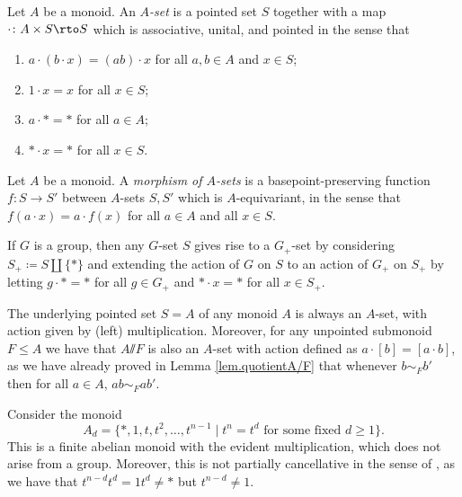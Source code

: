 \documentclass[11pt]{amsart}
\renewcommand{\ss}{\mathord{\sslash}}
\begin{document}
\begin{definition}
    Let $A$ be a monoid.  An \emph{$A$-set} is a pointed set $S$ together with a map $\cdot\colon  A \times S \rto S$ which is associative, unital, and pointed in the sense that
    \begin{enumerate}
    \item  $a \cdot (b\cdot x) = (ab) \cdot x$ for all $a,b\in A$ and $x\in S$;
        \item $1 \cdot x =x$ for all $x\in S$;
        \item $a \cdot * = *$ for all $a\in A$;
        \item $*\cdot x=*$ for all $x\in S$.
    \end{enumerate}
\end{definition}

\begin{definition}
    Let $A$ be a monoid. A \emph{morphism of $A$-sets} is a basepoint-preserving function $f\colon S\to S'$ between $A$-sets $S,S'$ which is $A$-equivariant, in the sense that $f(a\cdot x)=a\cdot f(x)$ for all $a\in A$ and all $x\in S$. 
\end{definition}

\begin{example}\label{ex:Gsets.as.Asets}
     If $G$ is a group, then any $G$-set $S$ gives rise to a $G_+$-set by considering $S_+\coloneqq S\amalg\{*\}$ and extending the action of $G$ on $S$ to an action of $G_+$ on $S_+$ by letting $g\cdot *=*$ for all $g\in G_+$ and $*\cdot x=*$ for all $x\in S_+$. 
\end{example}


\begin{example} \label{lem:multwelldef}
  The underlying pointed set $S=A$ of any monoid $A$ is always an $A$-set, with action given by (left) multiplication. Moreover, for any unpointed submonoid $F\leq A$ we have that $A \ss F$ is also an $A$-set with action defined as $a \cdot [b] = [a\cdot b]$, as we have already proved in Lemma \ref{lem.quotientA/F} that whenever $b \sim_F b'$ then for all $a\in A$, $ab \sim_F ab'$. 
\end{example}


\begin{example}\label{ex:A_d}
Consider the monoid \[A_d=\{*,1,t,t^2,\dots, t^{n-1} \mid t^n=t^d \text{ for some fixed } d\geq 1\}.\] This is a finite abelian monoid with the evident multiplication, which does not arise from a group. Moreover, this is not partially cancellative in the sense of \cite[Definition 1.2]{Hchuck}, as we have that $t^{n-d}t^d=1t^d\neq *$ but $t^{n-d}\neq 1$. %
\end{example}
\end{document}
